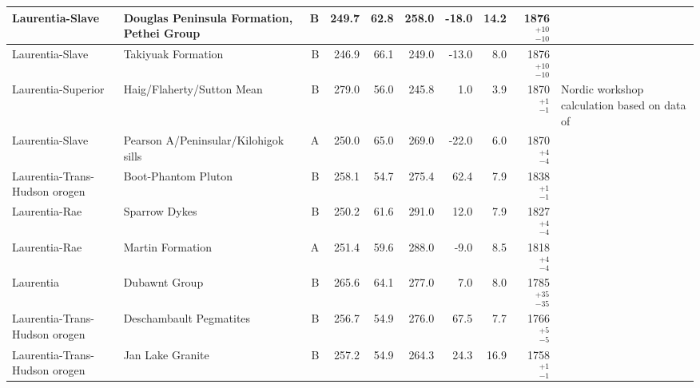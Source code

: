 \begin{longtable}{p{1 in}p{1 in}rrrrrrrp{1.5 in}}
               Laurentia-Slave &        Douglas Peninsula Formation, Pethei Group &      B &     249.7 &      62.8 & 258.0 & -18.0 &      14.2 &   1876$^{+10}_{-10}$ &                                \cite{Irving1979a} \\ \hline
               Laurentia-Slave &                               Takiyuak Formation &      B &     246.9 &      66.1 & 249.0 & -13.0 &       8.0 &   1876$^{+10}_{-10}$ &                                \cite{Irving1979a} \\ \hline
            Laurentia-Superior &                       Haig/Flaherty/Sutton Mean  &      B &     279.0 &      56.0 & 245.8 &   1.0 &       3.9 &     1870$^{+1}_{-1}$ &  Nordic workshop calculation based on data of \cite{Schmidt1980a, Schwarz1982a} \\ \hline
               Laurentia-Slave &             Pearson A/Peninsular/Kilohigok sills &      A &     250.0 &      65.0 & 269.0 & -22.0 &       6.0 &     1870$^{+4}_{-4}$ &                               \cite{Mitchell2010c} \\ \hline
 Laurentia-Trans-Hudson orogen &                              Boot-Phantom Pluton &      B &     258.1 &      54.7 & 275.4 &  62.4 &       7.9 &     1838$^{+1}_{-1}$ &                                 \cite{Symons1999a} \\ \hline
                 Laurentia-Rae &                                    Sparrow Dykes &      B &     250.2 &      61.6 & 291.0 &  12.0 &       7.9 &     1827$^{+4}_{-4}$ &                                \cite{McGlynn1974a} \\ \hline
                 Laurentia-Rae &                                 Martin Formation &      A &     251.4 &      59.6 & 288.0 &  -9.0 &       8.5 &     1818$^{+4}_{-4}$ &                                  \cite{Evans1973a} \\ \hline
                     Laurentia &                                    Dubawnt Group &      B &     265.6 &      64.1 & 277.0 &   7.0 &       8.0 &   1785$^{+35}_{-35}$ &                                    \cite{Park1973a} \\ \hline
 Laurentia-Trans-Hudson orogen &                          Deschambault Pegmatites &      B &     256.7 &      54.9 & 276.0 &  67.5 &       7.7 &     1766$^{+5}_{-5}$ &                                 \cite{Symons2000a} \\ \hline
 Laurentia-Trans-Hudson orogen &                                 Jan Lake Granite &      B &     257.2 &      54.9 & 264.3 &  24.3 &      16.9 &     1758$^{+1}_{-1}$ &                                   \cite{Gala1995a} \\ \hline

\end{longtable}
